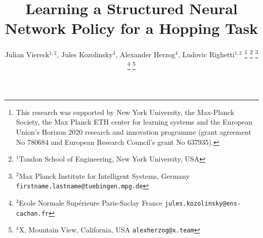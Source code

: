 \renewcommand{\baselinestretch}{.97}

%

\title{
\LARGE\bf Learning a Structured Neural Network Policy for a Hopping Task
}



\author{Julian Viereck$^{1, 2}$, Jules Kozolinsky$^{3}$, Alexander Herzog$^{4}$, Ludovic Righetti$^{1, 2}$
\thanks{This research was supported by New York University, the Max-Planck
Society, the Max Planck ETH center for learning systems and the European Union’s Horizon 2020 research and innovation
programme (grant agreement No 780684 and European Research Council's
grant No 637935).}%
\thanks{$^{1}$Tandon School of Engineering, New York University, USA}%
\thanks{$^{2}$Max Planck Institute for Intelligent Systems,
  Germany {\tt\footnotesize firstname.lastname@tuebingen.mpg.de}}%
\thanks{$^{3}$Ecole Normale Supérieure
  Paris-Saclay
  France {\tt\footnotesize jules.kozolinsky@ens-cachan.fr}}%
\thanks{$^{4}$X, Mountain View, California, USA {\tt\footnotesize alexherzog@x.team}}%
}



\maketitle


